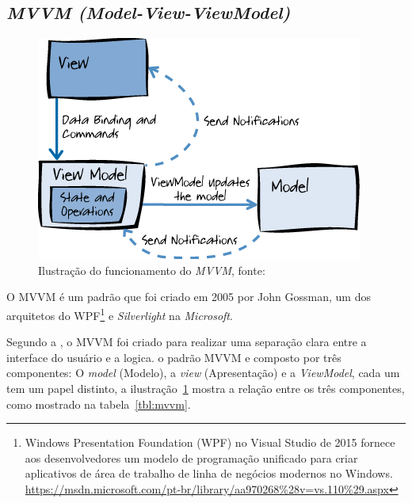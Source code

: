 \subsection{\textit{MVVM (Model-View-ViewModel)}}

    \begin{figure}[h]
        \centering
        \includegraphics[keepaspectratio=true,scale=0.8]{figuras/mvvm-microsoft.png}
        \caption{Ilustração do funcionamento do \textit{MVVM}, fonte: \cite{ms_mvvm}}
        \label{fig:mvvm-microsoft}
    \end{figure}

O \ac{MVVM} é um padrão que foi criado em 2005 por John Gossman, um dos arquitetos do \ac{WPF}\footnote{Windows Presentation Foundation (WPF) no Visual Studio de 2015 fornece aos desenvolvedores um modelo de programação unificado para criar aplicativos de área de trabalho de linha de negócios modernos no Windows. \url{https://msdn.microsoft.com/pt-br/library/aa970268\%28v=vs.110\%29.aspx}} e \textit{Silverlight} na \textit{Microsoft}.

Segundo a , o \acf{MVVM} foi criado para realizar uma separação clara entre a interface do usuário e a logica. o padrão \ac{MVVM} e composto por três componentes: O \textit{model} (Modelo), a \textit{view} (Apresentação) e a \textit{ViewModel}, cada um tem um papel distinto, a ilustração~\ref{fig:mvvm-microsoft} mostra a relação entre os três componentes, como mostrado na tabela~\ref{tbl:mvvm}.

